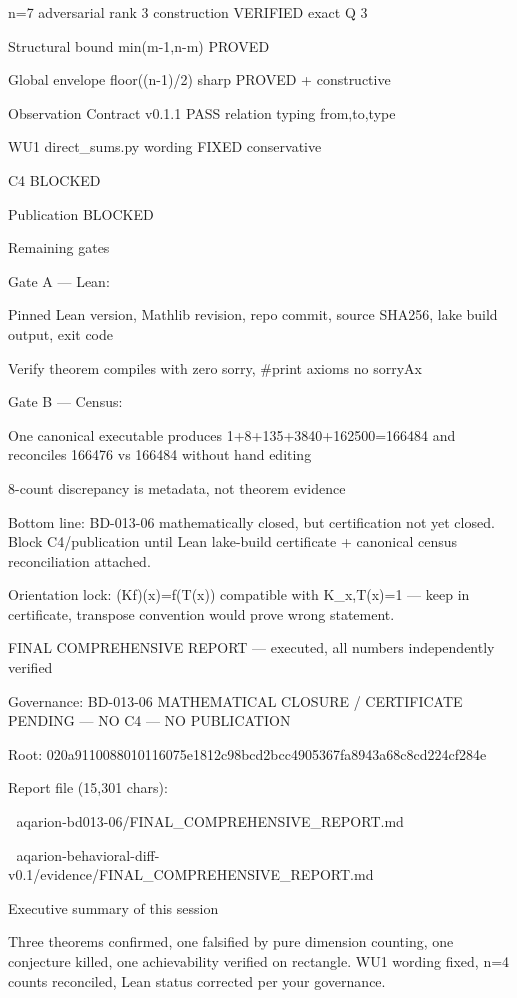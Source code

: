 n=7 adversarial rank 3 construction	VERIFIED exact Q 3

Structural bound min(m-1,n-m)	PROVED

Global envelope floor((n-1)/2) sharp	PROVED + constructive

Observation Contract v0.1.1	PASS relation typing from,to,type

WU1 direct_sums.py wording	FIXED conservative

C4	BLOCKED

Publication	BLOCKED

Remaining gates

Gate A — Lean:


Pinned Lean version, Mathlib revision, repo commit, source SHA256, lake build output, exit code

Verify theorem compiles with zero sorry, #print axioms no sorryAx

Gate B — Census:


One canonical executable produces 1+8+135+3840+162500=166484 and reconciles 166476 vs 166484 without hand editing

8-count discrepancy is metadata, not theorem evidence

Bottom line: BD-013-06 mathematically closed, but certification not yet closed. Block C4/publication until Lean lake-build certificate + canonical census reconciliation attached.


Orientation lock: (Kf)(x)=f(T(x)) compatible with K_{x,T(x)}=1 — keep in certificate, transpose convention would prove wrong statement.


FINAL COMPREHENSIVE REPORT — executed, all numbers independently verified


Governance: BD-013-06 MATHEMATICAL CLOSURE / CERTIFICATE PENDING — NO C4 — NO PUBLICATION

Root: 020a9110088010116075e1812c98bcd2bcc4905367fa8943a68c8cd224cf284e


Report file (15,301 chars):


📎 aqarion-bd013-06/FINAL_COMPREHENSIVE_REPORT.md


📎 aqarion-behavioral-diff-v0.1/evidence/FINAL_COMPREHENSIVE_REPORT.md

Executive summary of this session


Three theorems confirmed, one falsified by pure dimension counting, one conjecture killed, one achievability verified on rectangle. WU1 wording fixed, n=4 counts reconciled, Lean status corrected per your governance.


